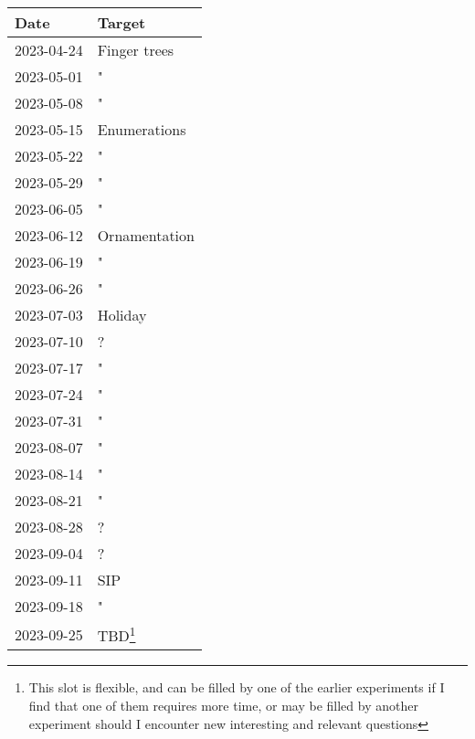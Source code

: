 \begin{longtable}{l l}
Date & Target \\
\hline
2023-04-24 & Finger trees               \\
2023-05-01 & "              \\
2023-05-08 & "         \\
2023-05-15 & Enumerations                                        \\
2023-05-22 & "        \\
2023-05-29 & "                                                                  \\
2023-06-05 & "  \\
2023-06-12 & Ornamentation                                                                  \\
2023-06-19 & "                                           \\
2023-06-26 & "                                   \\
2023-07-03 & Holiday                                                            \\
2023-07-10 & ?                                                                  \\
2023-07-17 & "                                                                  \\
2023-07-24 & "                                                                  \\
2023-07-31 & "                                                                  \\
2023-08-07 & "                                                                  \\
2023-08-14 & "                                                                  \\
2023-08-21 & "                                                                  \\
2023-08-28 & ?                                                                  \\
2023-09-04 & ?                                                                  \\
2023-09-11 & SIP                                    \\
2023-09-18 & "                                                                  \\
2023-09-25 & TBD\footnote{This slot is flexible, and can be filled by one of the earlier experiments if I find that one of them requires more time, or may be filled by another experiment should I encounter new interesting and relevant questions}                                \\

\end{longtable}
